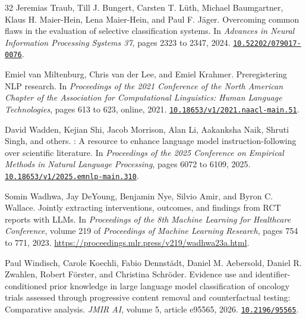 \documentclass[11pt,letterpaper]{article}
\newcommand{\doi}[1]{\href{https://doi.org/#1}{\nolinkurl{#1}}}
\begin{document}
\begin{thebibliography}{32}
Jeremias Traub, Till J. Bungert, Carsten T. L{\"u}th, Michael Baumgartner, Klaus H. Maier-Hein, Lena Maier-Hein, and Paul F. J{\"a}ger.
\newblock Overcoming common flaws in the evaluation of selective classification systems.
\newblock In \emph{Advances in Neural Information Processing Systems 37}, pages 2323 to 2347, 2024.
\newblock \doi{10.52202/079017-0076}.

Emiel van Miltenburg, Chris van der Lee, and Emiel Krahmer.
\newblock Preregistering {NLP} research.
\newblock In \emph{Proceedings of the 2021 Conference of the North American Chapter of the Association for Computational Linguistics: Human Language Technologies}, pages 613 to 623, online, 2021.
\newblock \doi{10.18653/v1/2021.naacl-main.51}.

David Wadden, Kejian Shi, Jacob Morrison, Alan Li, Aakanksha Naik, Shruti Singh, and others.
: A resource to enhance language model instruction-following over scientific literature.
\newblock In \emph{Proceedings of the 2025 Conference on Empirical Methods in Natural Language Processing}, pages 6072 to 6109, 2025.
\newblock \doi{10.18653/v1/2025.emnlp-main.310}.

Somin Wadhwa, Jay DeYoung, Benjamin Nye, Silvio Amir, and Byron C. Wallace.
\newblock Jointly extracting interventions, outcomes, and findings from {RCT} reports with {LLMs}.
\newblock In \emph{Proceedings of the 8th Machine Learning for Healthcare Conference}, volume 219 of \emph{Proceedings of Machine Learning Research}, pages 754 to 771, 2023.
\newblock \url{https://proceedings.mlr.press/v219/wadhwa23a.html}.

Paul Windisch, Carole Koechli, Fabio Dennst{\"a}dt, Daniel M. Aebersold, Daniel R. Zwahlen, Robert F{\"o}rster, and Christina Schr{\"o}der.
\newblock Evidence use and identifier-conditioned prior knowledge in large language model classification of oncology trials assessed through progressive content removal and counterfactual testing: Comparative analysis.
\newblock \emph{JMIR AI}, volume 5, article e95565, 2026.
\newblock \doi{10.2196/95565}.


\end{thebibliography}
\end{document}
